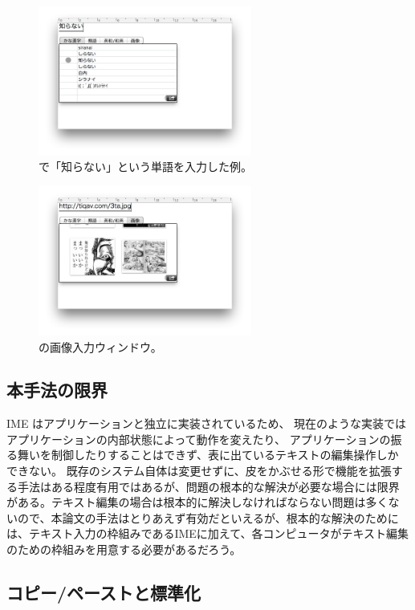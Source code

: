 \begin{figure}[H]
\centerline{\includegraphics[width=70mm,bb=0 0 600 400]{figures/image1.png}}
\caption{{\system}で「知らない」という単語を入力した例。}
\label{image1}
\end{figure}

\begin{figure}[H]
\centerline{\includegraphics[width=70mm,bb=0 0 600 400]{figures/image2.png}}
\caption{{\system}の画像入力ウィンドウ。}
\label{image2}
\end{figure}

\subsection{本手法の限界}

IME はアプリケーションと独立に実装されているため、
現在のような実装ではアプリケーションの内部状態によって動作を変えたり、
アプリケーションの振る舞いを制御したりすることはできず、表に出ているテキストの編集操作しか
できない。 既存のシステム自体は変更せずに、皮をかぶせる形で機能を拡張す
る手法はある程度有用ではあるが、問題の根本的な解決が必要な場合には限界
がある。テキスト編集の場合は根本的に解決しなければならない問題は多くな
いので、本論文の手法はとりあえず有効だといえるが、根本的な解決のために
は、テキスト入力の枠組みであるIMEに加えて、各コンピュータがテキスト編集
のための枠組みを用意する必要があるだろう。

\subsection{コピー/ペーストと標準化}

